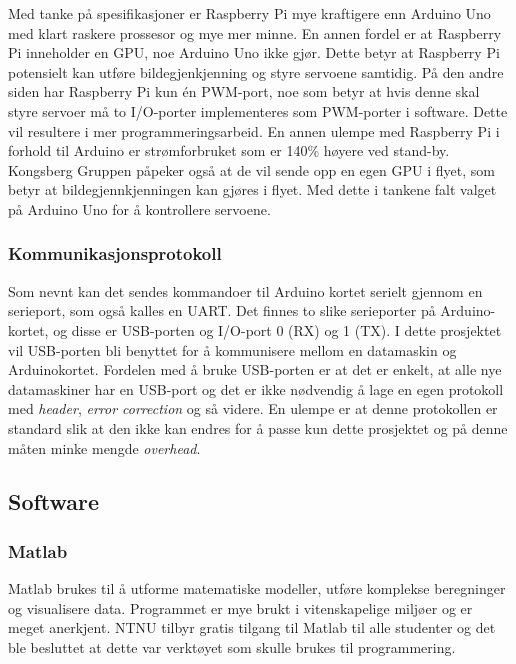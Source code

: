 Med tanke på spesifikasjoner er Raspberry Pi mye kraftigere enn Arduino Uno med klart raskere prossesor og mye mer minne. En annen fordel er at Raspberry Pi inneholder en GPU, noe Arduino Uno ikke gjør. Dette betyr at Raspberry Pi potensielt kan utføre bildegjenkjenning og styre servoene samtidig. På den andre siden har Raspberry Pi kun én PWM-port, noe som betyr at hvis denne skal styre servoer må to I/O-porter implementeres som PWM-porter i software. Dette vil resultere i mer programmeringsarbeid. En annen ulempe med Raspberry Pi i forhold til Arduino er strømforbruket som er 140\% høyere ved stand-by.\cite{ArduinoSpec,RpiSpec} Kongsberg Gruppen påpeker også at de vil sende opp en egen GPU i flyet, som betyr at bildegjennkjenningen kan gjøres i flyet. Med dette i tankene falt valget på Arduino Uno for å kontrollere servoene.

\subsubsection{Kommunikasjonsprotokoll}

Som nevnt kan det sendes kommandoer til Arduino kortet serielt gjennom en serieport, som også kalles en UART. Det finnes to slike serieporter på Arduino-kortet, og disse er USB-porten og I/O-port 0 (RX) og 1 (TX). I dette prosjektet vil USB-porten bli benyttet for å kommunisere mellom en datamaskin og Arduinokortet. Fordelen med å bruke USB-porten er at det er enkelt, at alle nye datamaskiner har en USB-port og det er ikke nødvendig å lage en egen protokoll med \emph{header}, \emph{error correction} og så videre. En ulempe er at denne protokollen er standard slik at den ikke kan endres for å passe kun dette prosjektet og på denne måten minke mengde \emph{overhead}.

\subsection{Software}

\subsubsection{Matlab}
Matlab brukes til å utforme matematiske modeller, utføre komplekse beregninger og visualisere data. \cite{matlab} Programmet er mye brukt i vitenskapelige miljøer og er meget anerkjent. NTNU tilbyr gratis tilgang til Matlab til alle studenter og det ble besluttet at dette var verktøyet som skulle brukes til programmering. 

